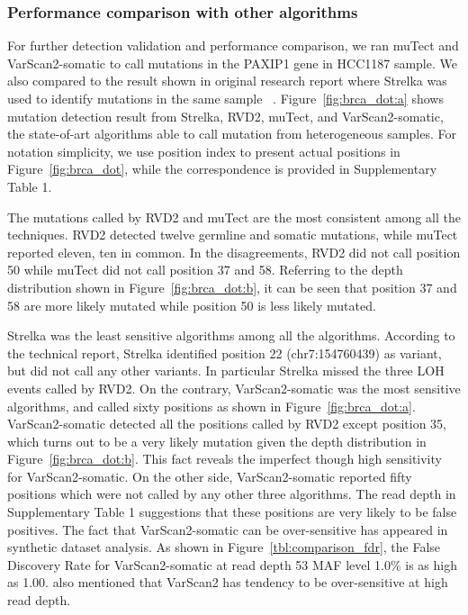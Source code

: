\documentclass{bioinfo}
\begin{document}
\subsubsection{Performance comparison with other algorithms}

For further detection validation and performance comparison, we ran muTect and VarScan2-somatic to call mutations in the PAXIP1 gene in HCC1187 sample. We also compared to the result shown in original research report where Strelka was used to identify mutations in the same sample ~\citep{hcc1187techreport}. Figure~\ref{fig:brca_dot:a} shows mutation detection result from Strelka, RVD2, muTect, and VarScan2-somatic, the state-of-art algorithms able to call mutation from heterogeneous samples. For notation simplicity, we use position index to present actual positions in Figure~\ref{fig:brca_dot}, while the correspondence is provided in Supplementary Table 1. 

The mutations called by RVD2 and muTect are the most consistent among all the techniques. RVD2 detected twelve germline and somatic mutations, while muTect reported eleven, ten in common. In the disagreements, RVD2 did not call position 50 while muTect did not call position 37 and 58. Referring to the depth distribution shown in Figure~\ref{fig:brca_dot:b}, it can be seen that position 37 and 58 are more likely mutated while position 50 is less likely mutated. 

Strelka was the least sensitive algorithms among all the algorithms. According to the technical report, Strelka identified position 22 (chr7:154760439) as variant, but did not call any other variants. In particular Strelka missed the three LOH events called by RVD2. On the contrary, VarScan2-somatic was the most sensitive algorithms, and called sixty positions as shown in Figure~\ref{fig:brca_dot:a}. VarScan2-somatic  detected all the positions called by RVD2 except position 35, which turns out to be a very likely mutation given the depth distribution in Figure~\ref{fig:brca_dot:b}. This fact reveals the imperfect though high sensitivity for VarScan2-somatic. On the other side, VarScan2-somatic reported fifty positions which were not called by any other three algorithms. The read depth in Supplementary Table 1 suggestions that these positions are very likely to be false positives. The fact that VarScan2-somatic can be over-sensitive has appeared in synthetic dataset analysis. As shown in Figure~\ref{tbl:comparison_fdr}, the False Discovery Rate for VarScan2-somatic at read depth 53 MAF level 1.0\% is as high as 1.00.  \citet{spencer2013performance} also mentioned that VarScan2 has tendency to be over-sensitive at high read depth. 
\end{document}
